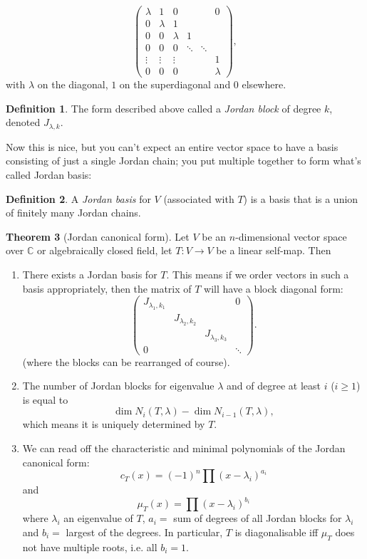 \documentclass[a4paper]{article}
\theoremstyle{definition}
\newtheorem{defn}{Definition}[subsection]
\newtheorem{thm}[defn]{Theorem}
\begin{document}
\[
\begin{pmatrix}
	\lambda & 1 & 0 & & & 0 \\ 0 & \lambda & 1 \\ 0 & 0 & \lambda & 1 \\ 0& 0& 0 & \ddots & \ddots \\ \vdots & \vdots & \vdots & & & 1 \\ 0 & 0 & 0 & & &\lambda
\end{pmatrix} ,
\]
with $\lambda$ on the diagonal, $1$ on the superdiagonal and $0$ elsewhere.
\begin{defn}
	The form described above called a \textit{Jordan block} of degree $k$, denoted $J_{\lambda,k}$.
\end{defn}
Now this is nice, but you can't expect an entire vector space to have a basis consisting of just a single Jordan chain; you put multiple together to form what's called Jordan basis:
\begin{defn}
	A \textit{Jordan basis} for $V$ (associated with $T$) is a basis that is a union of finitely many Jordan chains.
\end{defn}
\begin{thm}[Jordan canonical form]
	Let $V$ be an $n$-dimensional vector space over $\mathbb C$ or algebraically closed field, let $T:V\rightarrow V$ be a linear self-map. Then\begin{enumerate}
	    \item There exists a Jordan basis for $T$. This means if we order vectors in such a basis appropriately, then the matrix of $T$ will have a block diagonal form:
\[
\begin{pmatrix} J_{\lambda_1,k_1} & & & 0\\ & J_{\lambda_2,k_2} & \\ & & J_{\lambda_3,k_3} & \\0 & & & \ddots\end{pmatrix} .
\]
(where the blocks can be rearranged of course).
	    \item The number of Jordan blocks for eigenvalue $\lambda$ and of degree at least $i$ ($i\geq 1$) is equal to
\[
\dim N_i(T,\lambda)-\dim N_{i-1}(T,\lambda),
\]
which means it is uniquely determined by $T$.
	    \item We can read off the characteristic and minimal polynomials of the Jordan canonical form:
\[
c_T(x)=(-1)^n\prod (x-\lambda _i)^{a_i}
\]
and
\[
\mu_T(x)=\prod (x-\lambda _i)^{b_i}
\]
where $\lambda_i$ an eigenvalue of $T$, $a_i=$ sum of degrees of all Jordan blocks for $\lambda_i$ and $b_i=$ largest of the degrees. In particular, $T$ is diagonalisable iff $\mu_T$ does not have multiple roots, i.e. all $b_i=1$.
	\end{enumerate}
\end{thm}
\end{document}

